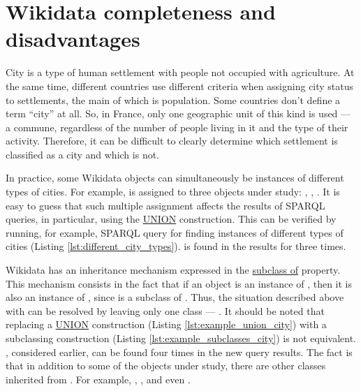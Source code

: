 \section{Wikidata completeness and disadvantages}

City is a type of human settlement with people not occupied with agriculture. At the same time, different countries use different criteria when assigning city status to settlements, the main of which is population. Some countries don't define a term ``city'' at all. So, in France, only one geographic unit of this kind is used — a commune, regardless of the number of people living in it and the type of their activity. Therefore, it can be difficult to clearly determine which settlement is classified as a city and which is not.

In practice, some Wikidata objects can simultaneously be instances of different types of cities. For example,  is assigned to three objects under study:  , , . It is easy to guess that such multiple assignment affects the results of SPARQL queries, in particular, using the \href{https://en.wikibooks.org/wiki/SPARQL/UNION}{UNION} construction. This can be verified by running, for example, SPARQL query for finding instances of different types of cities (Listing \ref{lst:different_city_types}).  is found in the results for three times.

Wikidata has an inheritance mechanism expressed in the  \href{https://www.wikidata.org/wiki/Property:P279}{subclass of} property. This mechanism consists in the fact that if an object is an instance of , then it is also an instance of , since  is a subclass of . Thus, the situation described above with  can be resolved by leaving only one class — . It should be noted that replacing a \href{https://en.wikibooks.org/wiki/SPARQL/UNION}{UNION} construction (Listing  \ref{lst:example_union_city}) with a subclassing construction (Listing \ref{lst:example_subclasses_city}) is not equivalent. , considered earlier, can be found four times in the new query results. The fact is that in addition to some of the objects under study, there are other classes inherited from . For example, , ,  and even .


